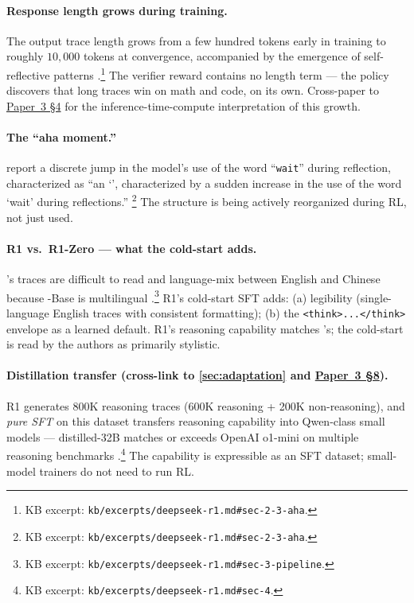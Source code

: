 \paragraph{Response length grows during training.} The output trace
length grows from a few hundred tokens early in training to roughly
$10{,}000$ tokens at convergence, accompanied by the emergence of
self-reflective patterns
\citep[\S 2.3]{deepseek-r1}.\footnote{KB excerpt:
\nolinkurl{kb/excerpts/deepseek-r1.md#sec-2-3-aha}.} The verifier reward
contains no length term — the policy discovers that long traces win on
math and code, on its own. Cross-paper to \hyperref[P3-sec:inference-compute-scaling]{Paper~3 §4} for the
inference-time-compute interpretation of this growth.

\paragraph{The ``aha moment.''} \citet[\S 2.3]{deepseek-r1} report a
discrete jump in the model's use of the word ``\texttt{wait}'' during
reflection, characterized as ``an `', characterized by a
sudden increase in the use of the word `wait' during reflections.''
\footnote{KB excerpt:
\nolinkurl{kb/excerpts/deepseek-r1.md#sec-2-3-aha}.} The 
structure is being actively reorganized during RL, not just used.

\paragraph{R1 vs.\ R1-Zero — what the cold-start adds.} 's traces
are difficult to read and language-mix between English and Chinese
because -Base is multilingual
\citep[\S 3]{deepseek-r1}.\footnote{KB excerpt:
\nolinkurl{kb/excerpts/deepseek-r1.md#sec-3-pipeline}.} R1's cold-start
SFT adds: (a) legibility (single-language English traces with consistent
formatting); (b) the \texttt{<think>...</think>} envelope as a learned
default. R1's reasoning capability matches 's; the cold-start is
read by the authors as primarily stylistic.

\paragraph{Distillation transfer (cross-link to \cref{sec:adaptation}
and \hyperref[P3-sec:r1-family]{Paper~3 §8}).} R1 generates $800$K reasoning traces (600K reasoning
+ 200K non-reasoning), and \emph{pure SFT} on this dataset transfers
reasoning capability into Qwen-class small models — distilled-32B
matches or exceeds OpenAI o1-mini on multiple reasoning benchmarks
\citep[\S 4]{deepseek-r1}.\footnote{KB excerpt:
\nolinkurl{kb/excerpts/deepseek-r1.md#sec-4}.} The capability is
expressible as an SFT dataset; small-model trainers do not need to run
RL.


